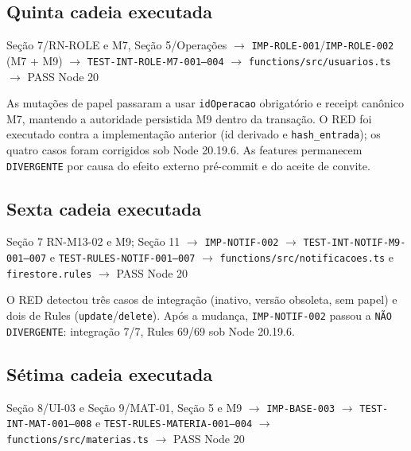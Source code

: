 \subsection{Quinta cadeia executada}

\begin{center}
Seção 7/RN-ROLE e M7, Seção 5/Operações
$\rightarrow$ \texttt{IMP-ROLE-001}/\texttt{IMP-ROLE-002} (M7 + M9)
$\rightarrow$ \texttt{TEST-INT-ROLE-M7-001--004}
$\rightarrow$ \nolinkurl{functions/src/usuarios.ts}
$\rightarrow$ PASS Node 20
\end{center}

As mutações de papel passaram a usar \texttt{idOperacao} obrigatório e receipt
canônico M7, mantendo a autoridade persistida M9 dentro da transação. O RED foi
executado contra a implementação anterior (id derivado e \texttt{hash\_entrada});
os quatro casos foram corrigidos sob Node 20.19.6. As features permanecem
\texttt{DIVERGENTE} por causa do efeito externo pré-commit e do aceite de convite.

\subsection{Sexta cadeia executada}

\begin{center}
Seção 7 RN-M13-02 e M9; Seção 11
$\rightarrow$ \texttt{IMP-NOTIF-002}
$\rightarrow$ \texttt{TEST-INT-NOTIF-M9-001--007} e \texttt{TEST-RULES-NOTIF-001--007}
$\rightarrow$ \nolinkurl{functions/src/notificacoes.ts} e \nolinkurl{firestore.rules}
$\rightarrow$ PASS Node 20
\end{center}

O RED detectou três casos de integração (inativo, versão obsoleta, sem papel) e
dois de Rules (\texttt{update}/\texttt{delete}). Após a mudança, \texttt{IMP-NOTIF-002}
passou a \texttt{NÃO DIVERGENTE}: integração 7/7, Rules 69/69 sob Node 20.19.6.

\subsection{Sétima cadeia executada}

\begin{center}
Seção 8/UI-03 e Seção 9/MAT-01, Seção 5 e M9
$\rightarrow$ \texttt{IMP-BASE-003}
$\rightarrow$ \texttt{TEST-INT-MAT-001--008} e \texttt{TEST-RULES-MATERIA-001--004}
$\rightarrow$ \nolinkurl{functions/src/materias.ts}
$\rightarrow$ PASS Node 20
\end{center}

